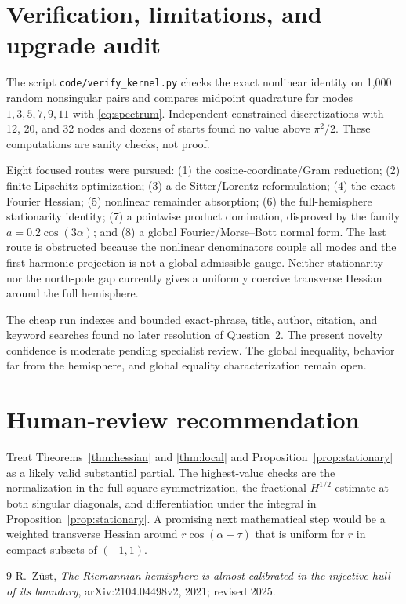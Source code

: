 \documentclass[11pt]{article}
\begin{document}
\section{Verification, limitations, and upgrade audit}

The script \texttt{code/verify\_kernel.py} checks the exact nonlinear identity on 1,000 random nonsingular pairs and compares midpoint quadrature for modes $1,3,5,7,9,11$ with \eqref{eq:spectrum}.  Independent constrained discretizations with 12, 20, and 32 nodes and dozens of starts found no value above $\pi^2/2$.  These computations are sanity checks, not proof.

Eight focused routes were pursued: (1) the cosine-coordinate/Gram reduction; (2) finite Lipschitz optimization; (3) a de Sitter/Lorentz reformulation; (4) the exact Fourier Hessian; (5) nonlinear remainder absorption; (6) the full-hemisphere stationarity identity; (7) a pointwise product domination, disproved by the family $a=0.2\cos(3\alpha)$; and (8) a global Fourier/Morse--Bott normal form.  The last route is obstructed because the nonlinear denominators couple all modes and the first-harmonic projection is not a global admissible gauge.  Neither stationarity nor the north-pole gap currently gives a uniformly coercive transverse Hessian around the full hemisphere.

The cheap run indexes and bounded exact-phrase, title, author, citation, and keyword searches found no later resolution of Question~2.  The present novelty confidence is moderate pending specialist review.  The global inequality, behavior far from the hemisphere, and global equality characterization remain open.

\section*{Human-review recommendation}

Treat Theorems~\ref{thm:hessian} and \ref{thm:local} and Proposition~\ref{prop:stationary} as a likely valid substantial partial.  The highest-value checks are the normalization in the full-square symmetrization, the fractional $H^{1/2}$ estimate at both singular diagonals, and differentiation under the integral in Proposition~\ref{prop:stationary}.  A promising next mathematical step would be a weighted transverse Hessian around $r\cos(\alpha-\tau)$ that is uniform for $r$ in compact subsets of $(-1,1)$.

\begin{thebibliography}{9}
R.~Z\"ust,
\emph{The Riemannian hemisphere is almost calibrated in the injective hull of its boundary},
arXiv:2104.04498v2, 2021; revised 2025.
\end{thebibliography}
\end{document}
